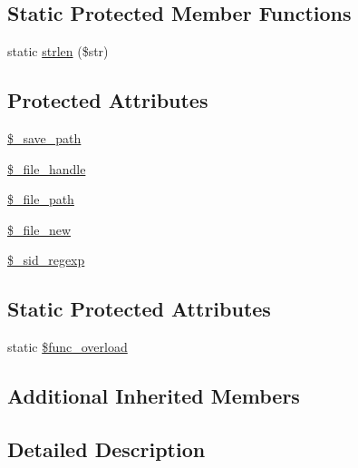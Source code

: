 \subsection*{Static Protected Member Functions}
\begin{DoxyCompactItemize}
\item 
static \mbox{\hyperlink{class_c_i___session__files__driver_a4c29a687d4ed62c26a10e41d98930d5f}{strlen}} (\$str)
\end{DoxyCompactItemize}
\subsection*{Protected Attributes}
\begin{DoxyCompactItemize}
\item 
\mbox{\hyperlink{class_c_i___session__files__driver_a6435cefa01b850e041ae9066224e8a4d}{\$\+\_\+save\+\_\+path}}
\item 
\mbox{\hyperlink{class_c_i___session__files__driver_a5d9e30c347d3adb8f7bd47da3566ce69}{\$\+\_\+file\+\_\+handle}}
\item 
\mbox{\hyperlink{class_c_i___session__files__driver_af2a67abb59f4c991dd98452ec6e6dcc7}{\$\+\_\+file\+\_\+path}}
\item 
\mbox{\hyperlink{class_c_i___session__files__driver_a996c4705d21476b028bf762e63257114}{\$\+\_\+file\+\_\+new}}
\item 
\mbox{\hyperlink{class_c_i___session__files__driver_a4e2477585e746eb415b2b69bb237be72}{\$\+\_\+sid\+\_\+regexp}}
\end{DoxyCompactItemize}
\subsection*{Static Protected Attributes}
\begin{DoxyCompactItemize}
\item 
static \mbox{\hyperlink{class_c_i___session__files__driver_aef84be58d58a5895572c5689e56a1047}{\$func\+\_\+overload}}
\end{DoxyCompactItemize}
\subsection*{Additional Inherited Members}


\subsection{Detailed Description}


